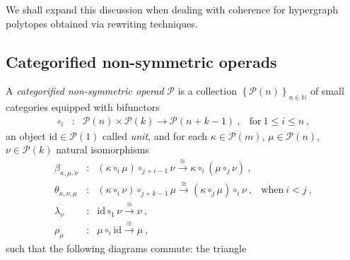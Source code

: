 We shall expand this discussion when dealing with coherence for hypergraph polytopes obtained via rewriting techniques.


\subsection{Categorified non-symmetric operads}

\begin{definition} A \emph{categorified non-symmetric operad} $\mathcal{P}$ is a collection $\left\{  \mathcal{P}(n)  \right\}_{n\in \mathbb{N}}$ of small categories equipped with bifunctors  
$$ \begin{array}{clll}
\circ_i&\colon& \mathcal{P}(n) \times
                  \mathcal{P}(k)
                  \longrightarrow \mathcal{P}(n+k-1) \ ,
                  & \text{for}\ 1 \leq i \leq n \ ,
\end{array}  $$
an object $\mathrm{id} \in \mathcal{P}(1)$ called \emph{unit}, and for each $\kappa \in \mathcal{P}(m)$,  $\mu \in \mathcal{P}(n)$, $\nu \in \mathcal{P}(k)$ natural isomorphisms 
$$ \begin{array}{clll}
    \beta_{\kappa,\mu,\nu}&\colon& 
    (\kappa \circ_i \mu) \circ_{j+i-1} \nu  \overset{\cong}{\longrightarrow} \kappa \circ_i (\mu \circ_j \nu) \ , &  \\
    \theta_{\kappa,\nu,\mu}&\colon& 
    (\kappa \circ_i \nu) \circ_{j+k-1} \mu 
    \overset{\cong}{\longrightarrow} (\kappa \circ_j \mu) \circ_i \nu \ , & \text{when}\ i < j \ , \\
    \lambda_\nu &\colon& 
    \mathrm{id} \circ_1 \nu \overset{\cong}{\longrightarrow} \nu \ , & \\
    \rho_\mu &\colon& 
    \mu \circ_i \mathrm{id} \overset{\cong}{\longrightarrow} \mu \ , & 
\end{array}  $$
such that the following diagrams commute: the triangle \\
\begin{center}
\end{center}
\end{definition}
